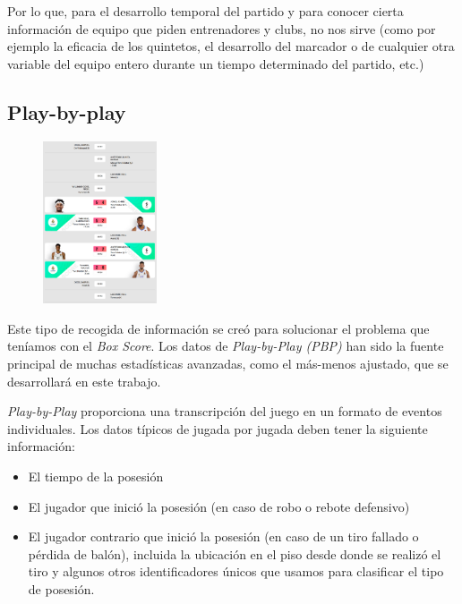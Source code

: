 \documentclass[paper=a4, fontsize=9pt]{article}
\begin{document}
Por lo que, para el desarrollo temporal del partido y para conocer cierta información de equipo que piden entrenadores y clubs, no nos sirve (como por ejemplo la eficacia de los quintetos, el desarrollo del marcador o de cualquier otra variable del equipo entero durante un tiempo determinado del partido, etc.)


\subsection{Play-by-play}

\begin{figure}
\centering
\includegraphics[width=0.3\textwidth]{imagenes/PBP_RM.png}
\captionsetup{width=.8\linewidth}
\label{fig:PBP_RM}
\end{figure}

Este tipo de recogida de información se creó para solucionar el problema que teníamos con el \emph{Box Score}. Los datos de \emph{Play-by-Play (PBP)} han sido la fuente principal de muchas estadísticas avanzadas, como el más-menos ajustado, que se desarrollará en este trabajo.

\emph{Play-by-Play} proporciona una transcripción del juego en un formato de eventos individuales. Los datos típicos de jugada por jugada deben tener la siguiente información:

\begin{itemize}
\item El tiempo de la posesión
\item El jugador que inició la posesión (en caso de robo o rebote defensivo)
\item El jugador contrario que inició la posesión (en caso de un tiro fallado o pérdida de balón), incluida la ubicación en el piso desde donde se realizó el tiro y algunos otros identificadores únicos que usamos para clasificar el tipo de posesión.
\end{itemize}
\end{document}
